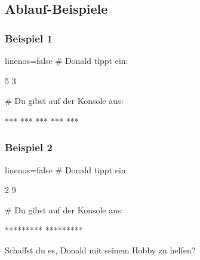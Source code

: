 \documentclass{\VorlagenPfad/coderdojokatext}
\begin{document}
	\newpage
	
	\subsection{Ablauf-Beispiele}
	\subsubsection{Beispiel 1}
\begin{pseudocode*}{linenos=false}
# Donald tippt ein:

5
3

# Du gibst auf der Konsole aus:

***
***
***
***
***
\end{pseudocode*}

\subsubsection{Beispiel 2}
\begin{pseudocode*}{linenos=false}
# Donald tippt ein:

2 
9

# Du gibst auf der Konsole aus:

*********
*********

\end{pseudocode*}

Schaffst du es, Donald mit seinem Hobby zu helfen?
\end{document}
